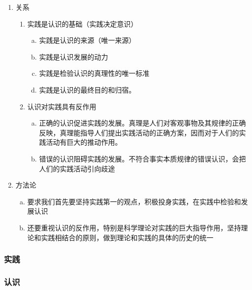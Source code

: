 \documentclass[12pt]{book}
\begin{document}
\begin{enumerate}[1.]
    \item 关系
          \begin{enumerate}[(1)]
              \item 实践是认识的基础（实践决定意识）
                    \begin{enumerate}[a.]
                        \item 实践是认识的来源（唯一来源）
                        \item 实践是认识发展的动力
                        \item 实践是检验认识的真理性的唯一标准
                        \item 实践是认识的最终目的和归宿。
                    \end{enumerate}
              \item 认识对实践具有反作用
                    \begin{enumerate}[a.]
                        \item 正确的认识促进实践的发展。真理是人们对客观事物及其规律的正确反映，真理能指导人们提出实践活动的正确方案，因而对于人们的实践活动有巨大的推动作用。
                        \item 错误的认识阻碍实践的发展。不符合事实本质规律的错误认识，会把人们的实践活动引向歧途
                    \end{enumerate}
          \end{enumerate}
    \item 方法论
          \begin{enumerate}[a.]
              \item 要求我们首先要坚持实践第一的观点，积极投身实践，在实践中检验和发展认识
              \item 还要重视认识的反作用，特别是科学理论对实践的巨大指导作用，坚持理论和实践相结合的原则，做到理论和实践的具体的历史的统一
          \end{enumerate}
\end{enumerate}










\subsubsection{实践}




\subsubsection{认识}
\end{document}
